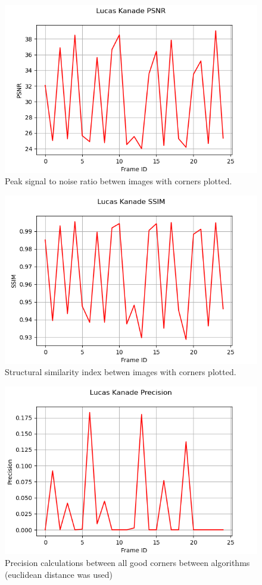 \documentclass[11pt, conference, letterpaper]{IEEEtran}
\begin{document}
\begin{figure}[t]
    \centering
    \includegraphics[width=0.9\linewidth]{images/lk_psnr.png}
    \caption{Peak signal to noise ratio betwen images with corners plotted.}
    \label{fig:lk-psnr}
\end{figure}

\begin{figure}[t]
    \centering
    \includegraphics[width=0.9\linewidth]{images/lk_ssim.png}
    \caption{Structural similarity index betwen images with corners plotted.}
    \label{fig:lk-ssim}
\end{figure}

\onecolumn

\begin{figure}[t]
    \centering
    \includegraphics[width=0.45\linewidth]{images/lk_precision.png}
    \caption{Precision calculations between all good corners between algorithms (euclidean distance was used)}
    \label{fig:lk-prec}
\end{figure}
\end{document}
